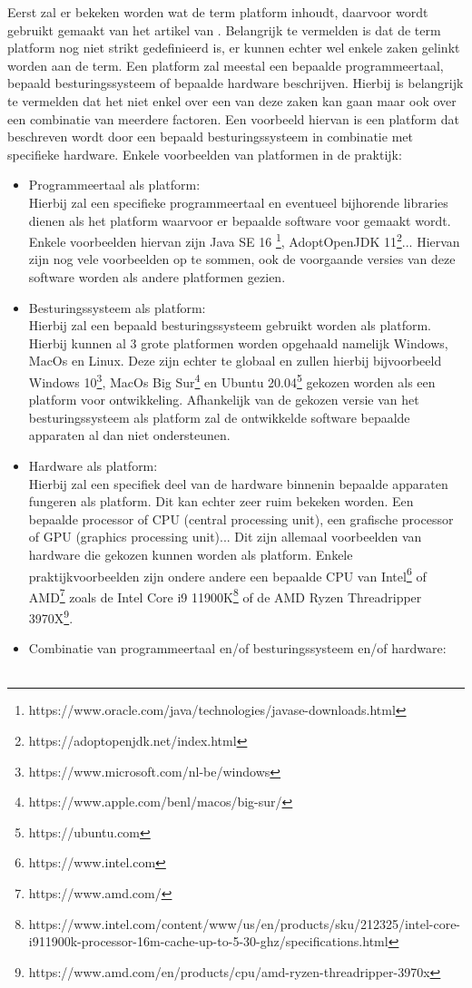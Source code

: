 Eerst zal er bekeken worden wat de term platform inhoudt, daarvoor wordt gebruikt gemaakt van het artikel van \textcite{Bishop2006}. Belangrijk te vermelden is dat de term platform nog niet strikt gedefinieerd is, er kunnen echter wel enkele zaken gelinkt worden aan de term. Een platform zal meestal een bepaalde programmeertaal, bepaald besturingssysteem of bepaalde hardware beschrijven. Hierbij is belangrijk te vermelden dat het niet enkel over een van deze zaken kan gaan maar ook over een combinatie van meerdere factoren. Een voorbeeld hiervan is een platform dat beschreven wordt door een bepaald besturingssysteem in combinatie met specifieke hardware. Enkele voorbeelden van platformen in de praktijk:
\begin{itemize}
\item Programmeertaal als platform:\\
Hierbij zal een specifieke programmeertaal en eventueel bijhorende libraries dienen als het platform waarvoor er bepaalde software voor gemaakt wordt. Enkele voorbeelden hiervan zijn Java SE 16 \footnote{https://www.oracle.com/java/technologies/javase-downloads.html}, AdoptOpenJDK 11\footnote{https://adoptopenjdk.net/index.html}... Hiervan zijn nog vele voorbeelden op te sommen, ook de voorgaande versies van deze software worden als andere platformen gezien.
\\

\item Besturingssysteem als platform:\\
Hierbij zal een bepaald besturingssysteem gebruikt worden als platform. Hierbij kunnen al 3 grote platformen worden opgehaald namelijk Windows, MacOs en Linux. Deze zijn echter te globaal en zullen hierbij bijvoorbeeld Windows 10\footnote{https://www.microsoft.com/nl-be/windows}, MacOs Big Sur\footnote{https://www.apple.com/benl/macos/big-sur/} en Ubuntu 20.04\footnote{https://ubuntu.com} gekozen worden als een platform voor ontwikkeling. Afhankelijk van de gekozen versie van het besturingssysteem als platform zal de ontwikkelde software bepaalde apparaten al dan niet ondersteunen.
\\

\item Hardware als platform:\\
Hierbij zal een specifiek deel van de hardware binnenin bepaalde apparaten fungeren als platform. Dit kan echter zeer ruim bekeken worden. Een bepaalde processor of CPU (central processing unit), een grafische processor of GPU (graphics processing unit)... Dit zijn allemaal voorbeelden van hardware die gekozen kunnen worden als platform. Enkele praktijkvoorbeelden zijn ondere andere een bepaalde CPU van Intel\footnote{https://www.intel.com} of AMD\footnote{https://www.amd.com/} zoals de Intel Core i9 11900K\footnote{https://www.intel.com/content/www/us/en/products/sku/212325/intel-core-i911900k-processor-16m-cache-up-to-5-30-ghz/specifications.html} of de AMD Ryzen Threadripper 3970X\footnote{https://www.amd.com/en/products/cpu/amd-ryzen-threadripper-3970x}.
\item Combinatie van programmeertaal en/of besturingssysteem en/of hardware: \\
\\


\end{itemize}
